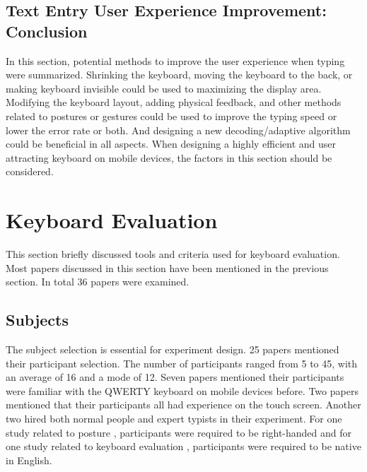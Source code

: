 \documentclass[11pt]{article}
\begin{document}
\subsection{Text Entry User Experience Improvement: Conclusion}
In this section, potential methods to improve the user experience when typing were summarized. Shrinking the keyboard, moving the keyboard to the back, or making keyboard invisible could be used to maximizing the display area. Modifying the keyboard layout, adding physical feedback, and other methods related to postures or gestures could be used to improve the typing speed or lower the error rate or both. And designing a new decoding/adaptive algorithm could be beneficial in all aspects. When designing a highly efficient and user attracting keyboard on mobile devices, the factors in this section should be considered.

\section{Keyboard Evaluation}\label{section-evaluation}
This section briefly discussed tools and criteria used for keyboard evaluation. Most papers discussed in this section have been mentioned in the previous section. In total 36 papers were examined.

\subsection{Subjects}
The subject selection is essential for experiment design. 25 papers mentioned their participant selection. The number of participants ranged from 5 to 45, with an average of 16 and a mode of 12. Seven papers mentioned their participants were familiar with the QWERTY keyboard on mobile devices before. Two papers \citep{10.1145/3173574.3174013, 10.1145/2371574.2371612} mentioned that their participants all had experience on the touch screen. Another two \citep{10.1145/2037373.2037440, 10.1145/1978942.1979301} hired both normal people and expert typists in their experiment. For one study related to posture \citep{10.1016/j.ijhcs.2008.03.004}, participants were required to be right-handed and for one study related to keyboard evaluation \citep{10.1145/2702123.2702273}, participants were required to be native in English.
\end{document}
